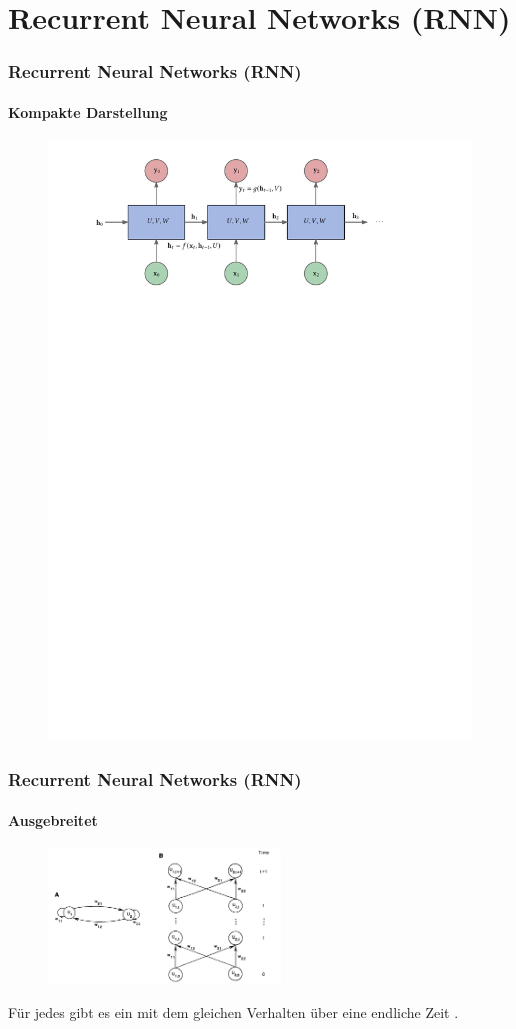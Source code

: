 \documentclass[german,aspectratio=169]{beamer}
\begin{document}
\section{Recurrent Neural Networks (RNN)}
\begin{frame}
	\frametitle{Recurrent Neural Networks (RNN)}
	\framesubtitle{Kompakte Darstellung}
			\begin{figure}
				\includegraphics[scale=0.9]{rnn-diagram-unfold}
			\end{figure}
\end{frame}

\begin{frame}
	\frametitle{Recurrent Neural Networks (RNN)}
		\framesubtitle{Ausgebreitet}
			\begin{figure}
			\includegraphics[width=0.55\textwidth]{simplest-rnn}
		\end{figure}
	\begin{theorem}
		Für jedes  gibt es ein  mit dem gleichen Verhalten über eine endliche Zeit \cite{Rumelhart1987}.
	\end{theorem}
\end{frame}
\end{document}
